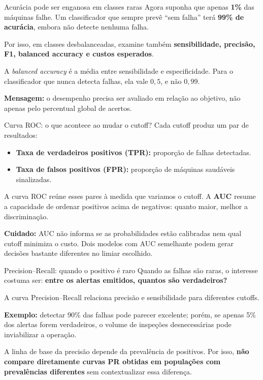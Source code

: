 \documentclass[
  10pt,
  ignorenonframetext,
  aspectratio=169,
  brazilian,
]{beamer}
\providecommand{\tightlist}{%
  \setlength{\itemsep}{0pt}\setlength{\parskip}{0pt}}
\begin{document}
\begin{frame}{Acurácia pode ser enganosa em classes raras}
\protect{}\label{acuruxe1cia-pode-ser-enganosa-em-classes-raras}
Agora suponha que apenas \textbf{1\%} das máquinas falhe. Um
classificador que sempre prevê ``sem falha'' terá \textbf{99\% de
acurácia}, embora não detecte nenhuma falha.

Por isso, em classes desbalanceadas, examine também
\textbf{sensibilidade, precisão, F1, balanced accuracy e custos
esperados}.

A \emph{balanced accuracy} é a média entre sensibilidade e
especificidade. Para o classificador que nunca detecta falhas, ela vale
\(0{,}5\), e não \(0{,}99\).

\textbf{Mensagem:} o desempenho precisa ser avaliado em relação ao
objetivo, não apenas pelo percentual global de acertos.
\end{frame}

\begin{frame}{Curva ROC: o que acontece ao mudar o cutoff?}
\protect{}\label{curva-roc-o-que-acontece-ao-mudar-o-cutoff}
Cada cutoff produz um par de resultados:

\begin{itemize}
\tightlist
\item
  \textbf{Taxa de verdadeiros positivos (TPR):} proporção de falhas
  detectadas.
\item
  \textbf{Taxa de falsos positivos (FPR):} proporção de máquinas
  saudáveis sinalizadas.
\end{itemize}

A curva ROC reúne esses pares à medida que variamos o cutoff. A
\textbf{AUC} resume a capacidade de ordenar positivos acima de
negativos: quanto maior, melhor a discriminação.

\textbf{Cuidado:} AUC não informa se as probabilidades estão calibradas
nem qual cutoff minimiza o custo. Dois modelos com AUC semelhante podem
gerar decisões bastante diferentes no limiar escolhido.
\end{frame}

\begin{frame}{Precision--Recall: quando o positivo é raro}
\protect{}\label{precisionrecall-quando-o-positivo-uxe9-raro}
Quando as falhas são raras, o interesse costuma ser: \textbf{entre os
alertas emitidos, quantos são verdadeiros?}

A curva Precision--Recall relaciona precisão e sensibilidade para
diferentes cutoffs.

\textbf{Exemplo:} detectar 90\% das falhas pode parecer excelente;
porém, se apenas 5\% dos alertas forem verdadeiros, o volume de
inspeções desnecessárias pode inviabilizar a operação.

A linha de base da precisão depende da prevalência de positivos. Por
isso, \textbf{não compare diretamente curvas PR obtidas em populações
com prevalências diferentes} sem contextualizar essa diferença.
\end{frame}
\end{document}
